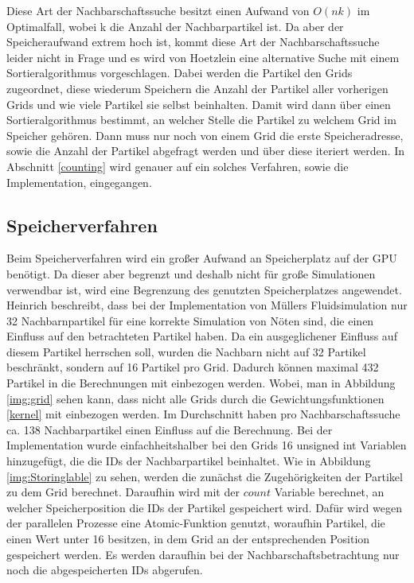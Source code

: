 \documentclass[intern,palatino]{cgBA}
\begin{document}
Diese Art der Nachbarschaftssuche besitzt einen Aufwand von $O(n k)$ im Optimalfall, wobei k die Anzahl der Nachbarpartikel ist. Da aber der Speicheraufwand extrem hoch ist, kommt diese Art der Nachbarschaftssuche leider nicht in Frage und es wird von Hoetzlein \cite{nvidia} eine alternative Suche mit einem Sortieralgorithmus vorgeschlagen.
\newline
Dabei werden die Partikel den Grids zugeordnet, diese wiederum Speichern die Anzahl der Partikel aller vorherigen Grids und wie viele Partikel sie selbst beinhalten. Damit wird dann über einen Sortieralgorithmus bestimmt, an welcher Stelle die Partikel zu welchem Grid im Speicher gehören. Dann muss nur noch von einem Grid die erste Speicheradresse, sowie die Anzahl der Partikel abgefragt werden und über diese iteriert werden.
\newline
In Abschnitt \ref{counting} wird genauer auf ein solches Verfahren, sowie die Implementation, eingegangen.


\subsection{Speicherverfahren}\label{speicher}

Beim Speicherverfahren wird ein großer Aufwand an Speicherplatz auf der GPU benötigt. Da dieser aber begrenzt und deshalb nicht für große Simulationen verwendbar ist, wird eine Begrenzung des genutzten Speicherplatzes angewendet. Heinrich \cite{nvidia2} beschreibt, dass bei der Implementation von Müllers \cite{muller2003particle} Fluidsimulation nur 32 Nachbarnpartikel für eine korrekte Simulation von Nöten sind, die einen Einfluss auf den betrachteten Partikel haben. Da ein ausgeglichener Einfluss auf diesem Partikel herrschen soll, wurden die Nachbarn nicht auf 32 Partikel beschränkt, sondern auf 16 Partikel pro Grid. Dadurch können maximal 432 Partikel in die Berechnungen mit einbezogen werden. Wobei, man in Abbildung \ref{img:grid} sehen kann, dass nicht alle Grids durch die Gewichtungsfunktionen \ref{kernel} mit einbezogen werden. Im Durchschnitt haben pro Nachbarschaftssuche ca. 138 Nachbarpartikel einen Einfluss auf die Berechnung.
\newline
Bei der Implementation wurde einfachheitshalber bei den Grids 16 unsigned int Variablen hinzugefügt, die die IDs der Nachbarpartikel beinhaltet.
\newline
Wie in Abbildung \ref{img:Storinglable} zu sehen, werden die zunächst die Zugehörigkeiten der Partikel zu dem Grid berechnet. Daraufhin wird mit der $count$ Variable berechnet, an welcher Speicherposition die IDs der Partikel gespeichert wird. Dafür wird wegen der parallelen Prozesse eine Atomic-Funktion genutzt, woraufhin Partikel, die einen Wert unter 16 besitzen, in dem Grid an der entsprechenden Position gespeichert werden. Es werden daraufhin bei der Nachbarschaftsbetrachtung nur noch die abgespeicherten IDs abgerufen. 
\end{document}
